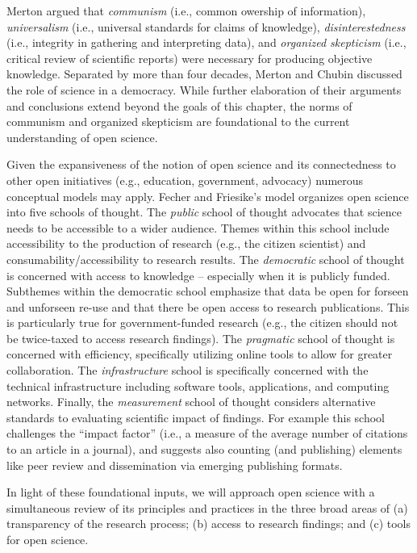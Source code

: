 \documentclass[
  11pt,
]{book}
\begin{document}
Merton \citeyearpar{merton_science_1942} argued that \emph{communism} (i.e., common owership of information), \emph{universalism} (i.e., universal standards for claims of knowledge), \emph{disinterestedness} (i.e., integrity in gathering and interpreting data), and \emph{organized skepticism} (i.e., critical review of scientific reports) were necessary for producing objective knowledge. Separated by more than four decades, Merton and Chubin \citeyearpar{chubin_open_1985} discussed the role of science in a democracy. While further elaboration of their arguments and conclusions extend beyond the goals of this chapter, the norms of communism and organized skepticism are foundational to the current understanding of open science.

Given the expansiveness of the notion of open science and its connectedness to other open initiatives (e.g., education, government, advocacy) numerous conceptual models may apply. Fecher and Friesike's \citeyearpar{fecher_open_2013} model organizes open science into five schools of thought. The \emph{public} school of thought advocates that science needs to be accessible to a wider audience. Themes within this school include accessibility to the production of research (e.g., the citizen scientist) and consumability/accessibility to research results. The \emph{democratic} school of thought is concerned with access to knowledge -- especially when it is publicly funded. Subthemes within the democratic school emphasize that data be open for forseen and unforseen re-use and that there be open access to research publications. This is particularly true for government-funded research (e.g., the citizen should not be twice-taxed to access research findings). The \emph{pragmatic} school of thought is concerned with efficiency, specifically utilizing online tools to allow for greater collaboration. The \emph{infrastructure} school is specifically concerned with the technical infrastructure including software tools, applications, and computing networks. Finally, the \emph{measurement} school of thought considers alternative standards to evaluating scientific impact of findings. For example this school challenges the ``impact factor'' (i.e., a measure of the average number of citations to an article in a journal), and suggests also counting (and publishing) elements like peer review and dissemination via emerging publishing formats.

In light of these foundational inputs, we will approach open science with a simultaneous review of its principles and practices in the three broad areas of (a) transparency of the research process; (b) access to research findings; and (c) tools for open science.
\end{document}
